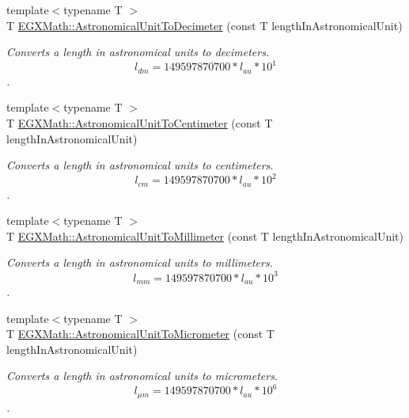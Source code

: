\begin{DoxyCompactItemize}
{\footnotesize template$<$typename T $>$ }\\T \mbox{\hyperlink{group___e_g_x_math-_conversions-_length_conversions-_astronomical-_astronomical_unit-_s_i_gab6dc67694d65c0f62ac3e4d750c5ed6e}{E\+G\+X\+Math\+::\+Astronomical\+Unit\+To\+Decimeter}} (const T length\+In\+Astronomical\+Unit)
\begin{DoxyCompactList}\small\item\em Converts a length in astronomical units to decimeters. \[ l_{dm}=149597870700 * l_{au} * 10^{1} \]. \end{DoxyCompactList}\item 
{\footnotesize template$<$typename T $>$ }\\T \mbox{\hyperlink{group___e_g_x_math-_conversions-_length_conversions-_astronomical-_astronomical_unit-_s_i_ga0d73749583f37bdf64ebe5cace907212}{E\+G\+X\+Math\+::\+Astronomical\+Unit\+To\+Centimeter}} (const T length\+In\+Astronomical\+Unit)
\begin{DoxyCompactList}\small\item\em Converts a length in astronomical units to centimeters. \[ l_{cm}=149597870700 * l_{au} * 10^{2} \]. \end{DoxyCompactList}\item 
{\footnotesize template$<$typename T $>$ }\\T \mbox{\hyperlink{group___e_g_x_math-_conversions-_length_conversions-_astronomical-_astronomical_unit-_s_i_ga8cb9e3414859d13ed8257893fff0f8b9}{E\+G\+X\+Math\+::\+Astronomical\+Unit\+To\+Millimeter}} (const T length\+In\+Astronomical\+Unit)
\begin{DoxyCompactList}\small\item\em Converts a length in astronomical units to millimeters. \[ l_{mm}=149597870700 * l_{au} * 10^{3} \]. \end{DoxyCompactList}\item 
{\footnotesize template$<$typename T $>$ }\\T \mbox{\hyperlink{group___e_g_x_math-_conversions-_length_conversions-_astronomical-_astronomical_unit-_s_i_ga23b887b2e141dc9686237c124e2245ac}{E\+G\+X\+Math\+::\+Astronomical\+Unit\+To\+Micrometer}} (const T length\+In\+Astronomical\+Unit)
\begin{DoxyCompactList}\small\item\em Converts a length in astronomical units to micrometers. \[ l_{\mu m}=149597870700 * l_{au} * 10^{6} \]. \end{DoxyCompactList}\item 

\end{DoxyCompactItemize}
